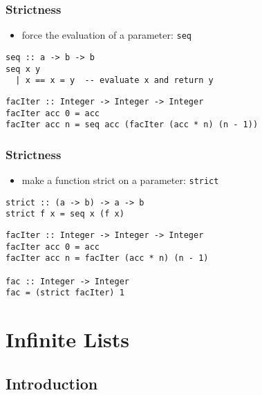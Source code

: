 \documentclass[dvipsnames]{beamer}
\theoremstyle{plain}
\begin{document}
\begin{frame}[fragile]
  \frametitle{Strictness}

  \begin{itemize}
    \item force the evaluation of a parameter:
      \lstinline|seq|
  \end{itemize}

  \begin{exampleblock}{}
    \begin{lstlisting}
seq :: a -> b -> b
seq x y
  | x == x = y  -- evaluate x and return y
    \end{lstlisting}

    \pause
    \medskip
    \begin{lstlisting}
facIter :: Integer -> Integer -> Integer
facIter acc 0 = acc
facIter acc n = seq acc (facIter (acc * n) (n - 1))
    \end{lstlisting}
  \end{exampleblock}
\end{frame}

\begin{frame}[fragile]
  \frametitle{Strictness}

  \begin{itemize}
    \item make a function strict on a parameter:
      \lstinline|strict|
  \end{itemize}

  \begin{exampleblock}{}
    \begin{lstlisting}
strict :: (a -> b) -> a -> b
strict f x = seq x (f x)
    \end{lstlisting}

    \pause
    \medskip
    \begin{lstlisting}
facIter :: Integer -> Integer -> Integer
facIter acc 0 = acc
facIter acc n = facIter (acc * n) (n - 1)

fac :: Integer -> Integer
fac = (strict facIter) 1
    \end{lstlisting}
  \end{exampleblock}
\end{frame}

\section{Infinite Lists}

\subsection{Introduction}
\end{document}

